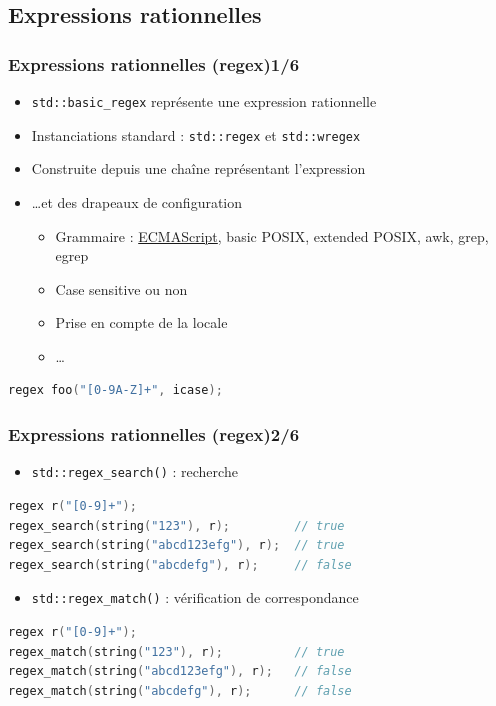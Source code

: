 \documentclass[C++.tex]{subfiles}
\begin{document}
\subsection*{Expressions rationnelles}
\begin{frame}[fragile]
	\frametitle{Expressions rationnelles (regex)\titlehfill{}1/6}
	\begin{itemize}
		\item \lstinline|std::basic_regex| représente une expression rationnelle
		\item Instanciations standard : \lstinline|std::regex| et \lstinline|std::wregex|
		\item Construite depuis une chaîne représentant l'expression
		\item \ldots et des drapeaux de configuration
		\begin{itemize}
			\item Grammaire : \underline{ECMAScript}, basic POSIX, extended POSIX, awk, grep, egrep
			\item Case sensitive ou non
			\item Prise en compte de la locale
			\item \ldots
		\end{itemize}
	\end{itemize}

	\begin{lstlisting}[language=C++]
regex foo("[0-9A-Z]+", icase);\end{lstlisting}
\end{frame}

\begin{frame}[fragile]
	\frametitle{Expressions rationnelles (regex)\titlehfill{}2/6}
	\begin{itemize}
		\item\lstinline|std::regex_search()| : recherche
	\end{itemize}

	\begin{lstlisting}[language=C++]
regex r("[0-9]+");
regex_search(string("123"), r);         // true
regex_search(string("abcd123efg"), r);  // true
regex_search(string("abcdefg"), r);     // false\end{lstlisting}

	\begin{itemize}
		\item \lstinline|std::regex_match()| : vérification de correspondance
	\end{itemize}

	\begin{lstlisting}[language=C++]
regex r("[0-9]+");
regex_match(string("123"), r);          // true
regex_match(string("abcd123efg"), r);   // false
regex_match(string("abcdefg"), r);      // false\end{lstlisting}
\end{frame}
\end{document}
